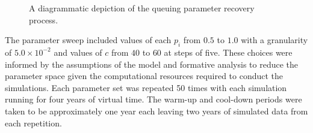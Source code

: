 \documentclass[11pt]{article}
\DeclareMathOperator*{\argmin}{arg\,min}
\begin{document}
\begin{figure}
{
    }
    \caption{%
        A diagrammatic depiction of the queuing parameter recovery process.
    }\label{fig:process}
\end{figure}

The parameter sweep included values of each \(p_i\) from \(0.5\) to \(1.0\) with
a granularity of \(5.0 \times 10^{-2}\) and values of \(c\) from \(40\) to
\(60\) at steps of five. These choices were informed by the assumptions of the
model and formative analysis to reduce the parameter space given the
computational resources required to conduct the simulations. Each parameter set
was repeated 50 times with each simulation running for four years of virtual
time. The warm-up and cool-down periods were taken to be approximately one year
each leaving two years of simulated data from each repetition.
\end{document}
